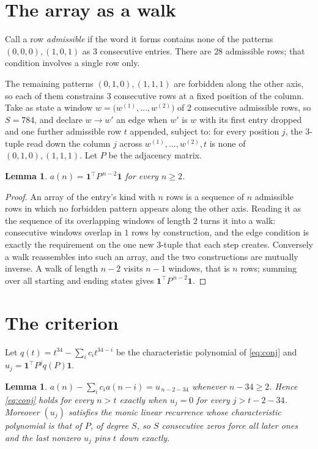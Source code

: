 \documentclass[11pt,a4paper]{article}
\theoremstyle{plain}
\newtheorem{lemma}[theorem]{Lemma}
\theoremstyle{definition}
\begin{document}
\section{The array as a walk}

Call a row \emph{admissible} if the word it forms contains none of the patterns
$(0,0,0), (1,0,1)$ as $3$ consecutive entries. There are $28$ admissible rows; that condition
involves a single row only.

The remaining patterns $(0,1,0), (1,1,1)$ are forbidden along the other axis, so each of them
constrains $3$ consecutive rows at a fixed position of the column. Take as state a
window $w=\bigl(w^{(1)},\dots,w^{(2)}\bigr)$ of $2$ consecutive admissible
rows, so $S=784$, and declare $w\to w'$ an edge when $w'$ is $w$ with its first entry
dropped and one further admissible row $t$ appended, subject to: for every position
$j$, the $3$-tuple read down the column $j$ across $w^{(1)},\dots,w^{(2)},t$
is none of $(0,1,0), (1,1,1)$. Let $P$ be the adjacency matrix.

\begin{lemma}\label{lem:walk}
$a(n)=\mathbf{1}^{\!\top}P^{\,n-2}\mathbf{1}$ for every $n\ge2$.
\end{lemma}

\begin{proof}
An array of the entry's kind with $n$ rows is a sequence of $n$ admissible rows in
which no forbidden pattern appears along the other axis. Reading it as the sequence of its
overlapping windows of length $2$ turns it into a walk: consecutive windows overlap in
$1$ rows by construction, and the edge condition is exactly the requirement on the one
new $3$-tuple that each step creates. Conversely a walk reassembles into such an array,
and the two constructions are mutually inverse. A walk of length $n-2$ visits $n-1$
windows, that is $n$ rows; summing over all starting and ending states gives
$\mathbf{1}^{\!\top}P^{\,n-2}\mathbf{1}$.
\end{proof}

\section{The criterion}

Let $q(t)=t^{34}-\sum_i c_i t^{34-i}$ be the characteristic polynomial of
\eqref{eq:conj} and $u_j=\mathbf{1}^{\!\top}P^{j}q(P)\mathbf{1}$.

\begin{lemma}\label{lem:crit}
$a(n)-\sum_i c_i a(n-i)=u_{\,n-2-34}$ whenever $n-34\ge2$. Hence
\eqref{eq:conj} holds for every $n>t$ exactly when $u_j=0$ for every
$j>t-2-34$. Moreover $(u_j)$ satisfies the monic linear recurrence whose
characteristic polynomial is that of $P$, of degree $S$, so $S$ consecutive zeros force all
later ones and the last nonzero $u_j$ pins $t$ down exactly.
\end{lemma}
\end{document}
